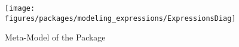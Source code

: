 %
%

\begin{figure}[htb]
  \centering
  \texttt{[image: figures/packages/modeling\_expressions/ExpressionsDiag]}
  \caption{Meta-Model of the  Package}
  \label{fig:MM:expressions}
\end{figure}
